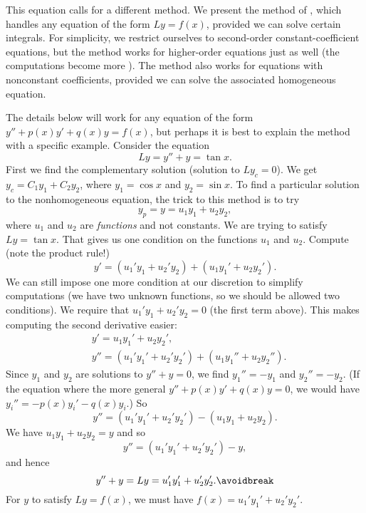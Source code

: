 This equation calls for a different method.  We present the method of
\emph{}, which handles any equation of
the form $Ly = f(x)$,
provided we can solve certain integrals.  For simplicity, we restrict
ourselves to second-order constant-coefficient equations,
but the method works for
higher-order equations just as well (the computations become more
). %
The method also works for equations with nonconstant coefficients,
provided we can solve the associated homogeneous equation.

The details below will work for any equation of the form
$y''+p(x)y' +q(x)y = f(x)$, but
perhaps it is best to explain the method with a specific example.
Consider the equation
\begin{equation*}
Ly = y''+y = \tan x .
\end{equation*}
First we find the complementary solution (solution to $Ly_c = 0$).  
We get $y_c = C_1 y_1 + C_2 y_2$, where $y_1 = \cos x$ and $y_2 = \sin x$.
To find a particular solution to the nonhomogeneous equation, 
the trick to this method is to try
\begin{equation*}
y_p = y = u_1 y_1 + u_2 y_2 ,
\end{equation*}
where $u_1$ and $u_2$ are \emph{functions} and not constants.
We are trying to satisfy $Ly = \tan x$.  That gives us one condition on the
functions $u_1$ and $u_2$.
Compute (note the product rule!)
\begin{equation*}
y' = (u_1' y_1 + u_2' y_2) + (u_1 y_1' + u_2 y_2').
\end{equation*}
We can still
impose one more condition at our discretion to simplify computations (we have two unknown functions,
so we should be allowed two conditions).  We require that
$u_1' y_1 + u_2' y_2 = 0$ (the first term above).
This makes computing the second derivative easier:
\begin{align*}
& y' = u_1 y_1' + u_2 y_2' , \\
& y'' = (u_1' y_1' + u_2' y_2') + (u_1 y_1'' + u_2 y_2'') .
\end{align*}
Since $y_1$ and $y_2$ are solutions to $y''+y = 0$, we find
$y_1'' = - y_1$
and $y_2'' = - y_2$.
(If the equation where the more general
$y''+p(x)y' +q(x)y = 0$, we would have
$y_i'' = -p(x)y_i' -q(x)y_i$.) So 
\begin{equation*}
y'' = (u_1' y_1' + u_2' y_2') - (u_1 y_1 + u_2 y_2) .
\end{equation*}
We have $u_1 y_1 + u_2 y_2 = y$ and so
\begin{equation*}
y'' = (u_1' y_1' + u_2' y_2') - y ,
\end{equation*}
and hence
\begin{equation*}
y'' + y = Ly = u_1' y_1' + u_2' y_2' .
\avoidbreak
\end{equation*}
For $y$ to satisfy $Ly = f(x)$, we must have
$f(x) = u_1' y_1' + u_2' y_2'$.

